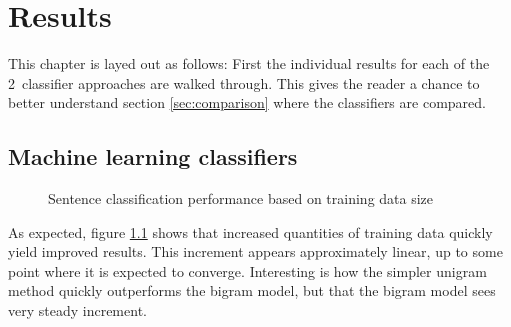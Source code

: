 \documentclass[a4paper,11pt]{kth-mag}
\newcommand{\numClassifierAproaches}{2}
\begin{document}


\chapter{Results}

This chapter is layed out as follows: First the individual results for each of the \numClassifierAproaches~classifier approaches are walked through. This gives the reader a chance to better understand section \ref{sec:comparison} where the classifiers are compared.


\section{Machine learning classifiers}

\begin{figure}[h!]
  \centering

  \caption{Sentence classification performance based on training data size}
  \label{fig:data_size}
\end{figure}


As expected, figure \ref {fig:data_size} shows that increased quantities of training data quickly yield improved results. This increment appears approximately linear, up to some point where it is expected to converge. Interesting is how the simpler unigram method quickly outperforms the bigram model, but that the bigram model sees very steady increment.

\newpage
\end{document}
